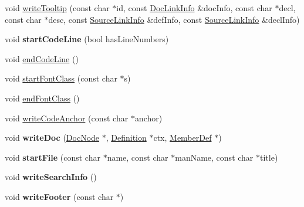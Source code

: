 \begin{DoxyCompactItemize}
void \mbox{\hyperlink{class_latex_generator_a0d3d8d57eb16730742b95b4c460cce1f}{write\+Tooltip}} (const char $\ast$id, const \mbox{\hyperlink{struct_doc_link_info}{Doc\+Link\+Info}} \&doc\+Info, const char $\ast$decl, const char $\ast$desc, const \mbox{\hyperlink{struct_source_link_info}{Source\+Link\+Info}} \&def\+Info, const \mbox{\hyperlink{struct_source_link_info}{Source\+Link\+Info}} \&decl\+Info)
\item 
\mbox{\label{class_latex_generator_a9bfa7242e97eca8f1d795245bb98fa37}} 
void {\bfseries start\+Code\+Line} (bool has\+Line\+Numbers)
\item 
void \mbox{\hyperlink{class_latex_generator_a87b0106936769e1226310df32ec5e1a6}{end\+Code\+Line}} ()
\item 
void \mbox{\hyperlink{class_latex_generator_a8dc4dcc8aaa2a591a1fb7f06896cd5af}{start\+Font\+Class}} (const char $\ast$s)
\item 
void \mbox{\hyperlink{class_latex_generator_a553927a6db74aca325fa50bd666b44b0}{end\+Font\+Class}} ()
\item 
void \mbox{\hyperlink{class_latex_generator_af9dc92f8c155f2bb2f5d969ea5ef7cff}{write\+Code\+Anchor}} (const char $\ast$anchor)
\item 
\mbox{\label{class_latex_generator_a450603f1d10ea9800c40f7b1fb4d97bf}} 
void {\bfseries write\+Doc} (\mbox{\hyperlink{class_doc_node}{Doc\+Node}} $\ast$, \mbox{\hyperlink{class_definition}{Definition}} $\ast$ctx, \mbox{\hyperlink{class_member_def}{Member\+Def}} $\ast$)
\item 
\mbox{\label{class_latex_generator_a4658c98545414c4147d7e589f844c83c}} 
void {\bfseries start\+File} (const char $\ast$name, const char $\ast$man\+Name, const char $\ast$title)
\item 
\mbox{\label{class_latex_generator_add0395c556a2d1b36d7d75c81473fb78}} 
void {\bfseries write\+Search\+Info} ()
\item 
\mbox{\label{class_latex_generator_afc74e3c16856f30b050edebf0e83416e}} 
void {\bfseries write\+Footer} (const char $\ast$)
\item 
\mbox{\label{class_latex_generator_a3f6c0d82d907c01684a159c6aa8fa880}} 

\end{DoxyCompactItemize}
